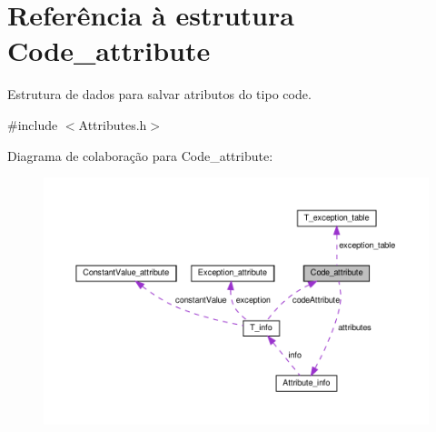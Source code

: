 \hypertarget{structCode__attribute}{}\section{Referência à estrutura Code\+\_\+attribute}
\label{structCode__attribute}


Estrutura de dados para salvar atributos do tipo code.  




{\ttfamily \#include $<$Attributes.\+h$>$}



Diagrama de colaboração para Code\+\_\+attribute\+:
\nopagebreak
\begin{figure}[H]
\begin{center}
\leavevmode
\includegraphics[width=350pt]{structCode__attribute__coll__graph}
\end{center}
\end{figure}
